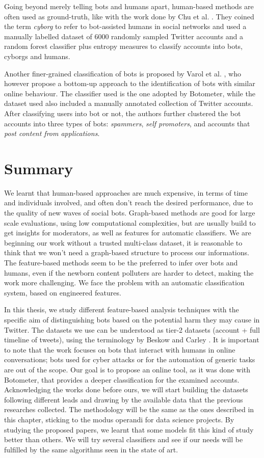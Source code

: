 Going beyond merely telling bots and humans apart, human-based methods are often used as ground-truth, like with the work done by Chu et al. \cite{Cyborgs}. They coined the term \emph{cyborg} to refer to bot-assisted humans in social networks and used a manually labelled dataset of 6000 randomly sampled Twitter accounts and a random forest classifier plus entropy measures to classify accounts into bots, cyborgs and humans.

Another finer-grained classification of bots is proposed by Varol et al. \cite{Varol}, who however propose a bottom-up approach to the identification of bots with similar online behaviour. The classifier used is the one adopted by Botometer, while the dataset used also included a manually annotated collection of Twitter accounts. After classifying users into bot or not, the authors further clustered the bot accounts into three types of bots: \emph{spammers}, \textit{self promoters}, and accounts that \textit{post content from applications}.

\section{Summary}
We learnt that human-based approaches are much expensive, in terms of time and individuals involved, and often don't reach the desired performance, due to the quality of new waves of social bots.
Graph-based methods are good for large scale evaluations, using low computational complexities, but are usually build to get insights for moderators, as well as features for automatic classifiers.
We are beginning our work without a trusted multi-class dataset, it is reasonable to think that we won't need a graph-based structure to process our informations.
The feature-based methods seem to be the preferred to infer over bots and humans, even if the newborn content polluters are harder to detect, making the work more challenging.
We face the problem with an automatic classification system, based on engineered features.

In this thesis, we study different feature-based analysis techniques with the specific aim of distinguishing bots based on the potential harm they may cause in Twitter. The datasets we use can be understood as tier-2 datasets (account + full timeline of tweets), using the terminology by Beskow and Carley \cite{Bot-Hunter}. It is important to note that the work focuses on bots that interact with humans in online conversations; bots used for cyber attacks or for the automation of generic tasks are out of the scope. Our goal is to propose an online tool, as it was done with Botometer, that provides a deeper classification for the examined accounts. Acknowledging the works done before ours, we will start building the datasets following different leads and drawing by the available data that the previous researches collected. The methodology will be the same as the ones described in this chapter, sticking to the modus operandi for data science projects.
By studying the proposed papers, we learnt that some models fit this kind of study better than others. We will try several classifiers and see if our needs will be fulfilled by the same algorithms seen in the state of art.

